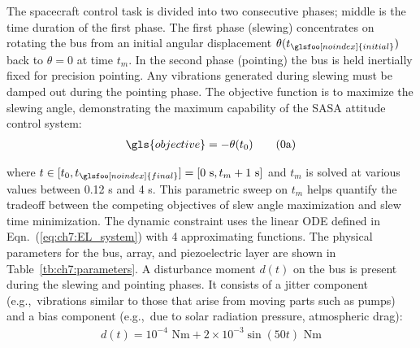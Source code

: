 The spacecraft control task is divided into two consecutive phases; \gls{middle} is the time duration of the first phase. The first phase (slewing) concentrates on rotating the bus from an initial angular displacement $\theta(t_{\glsfoo[noindex]{initial}})$ back to $\theta = 0$ at time $t_m$. In the second phase (pointing) the bus is held inertially fixed for precision pointing. Any vibrations generated during slewing must be damped out during the pointing phase. The objective function is to maximize the slewing angle, demonstrating the maximum capability of the SASA attitude control system:
\begin{align}
\gls{objective} = -\theta(t_0) \tag{\theequation a} \label{eq:ch7:obj}
\end{align}

\noindent where $t \in [t_0,t_{\glsfoo[noindex]{final}}] = [0 \text{ s},t_m+1\text{ s}]$ and $t_m$ is solved at various values between 0.12 s and 4 s. This parametric sweep on $t_m$ helps quantify the tradeoff between the competing objectives of slew angle maximization and slew time minimization. The dynamic constraint uses the linear ODE defined in Eqn.~(\ref{eq:ch7:EL_system}) with 4 approximating functions. The physical parameters for the bus, array, and piezoelectric layer are shown in Table~\ref{tb:ch7:parameters}. A disturbance moment $d(t)$ on the bus is present during the slewing and pointing phases. It consists of a jitter component (e.g.,~vibrations similar to those that arise from moving parts such as pumps) and a bias component (e.g.,~due to solar radiation pressure, atmospheric drag):
\begin{align}
d(t) = 10^{-4} \text{ Nm} + 2\times 10^{-3}\sin(50t)  \text{ Nm}  \tag{\theequation b} \label{eq:ch7:disturbance}
\end{align}


